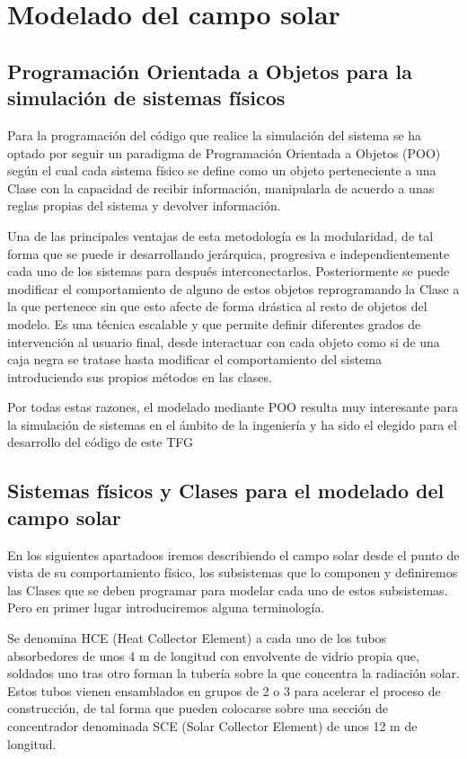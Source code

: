 \chapter{Modelado del campo solar}
\label{modeladodelcamposolar}

\section{Programación Orientada a Objetos para la simulación de sistemas físicos}

Para la programación del código que realice la simulación del sistema se ha optado por seguir un paradigma de Programación Orientada a Objetos (POO) según el cual cada sistema físico se define como un objeto perteneciente a una Clase con la capacidad de recibir información, manipularla de acuerdo a unas reglas propias del sistema y devolver información.

Una de las principales ventajas de esta metodología es la modularidad, de tal forma que se puede ir desarrollando jerárquica, progresiva e independientemente cada uno de los sistemas para después interconectarlos. Posteriormente se puede modificar el comportamiento de alguno de estos objetos reprogramando la Clase a la que pertenece sin que esto afecte de forma drástica al resto de objetos del modelo. Es una técnica escalable y que permite definir diferentes grados de
intervención al usuario final, desde interactuar con cada objeto como si de una caja negra se tratase hasta modificar el comportamiento del sistema introduciendo sus propios métodos en las clases.

Por todas estas razones, el modelado mediante POO resulta muy interesante para la simulación de sistemas en el ámbito de la ingeniería y ha sido el elegido para el desarrollo del código de este TFG 
\section{Sistemas físicos y Clases para el modelado del campo solar}

En los siguientes apartadoos iremos describiendo el campo solar desde el punto de vista de su comportamiento físico, los subsistemas que lo componen y definiremos las Clases que se deben programar para modelar cada uno de estos subsistemas. Pero en primer lugar introduciremos alguna terminología.

Se denomina HCE (Heat Collector Element) a cada uno de los tubos absorbedores de unos 4 m de longitud con envolvente de vidrio propia que, soldados uno tras otro forman la tubería sobre la que concentra la radiación solar. Estos tubos vienen ensamblados en grupos de 2 o 3 para acelerar el proceso de construcción, de tal forma que pueden colocarse sobre una sección de concentrador denominada SCE (Solar Collector Element) de unos 12 m de longitud.

